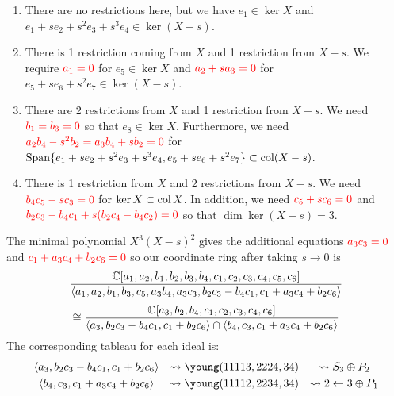 \documentclass{article}
\begin{document}
\begin{enumerate}[label=\boxed{\arabic*}:]
    \item There are no restrictions here, but we have $e_1 \in \ker X$ and $e_1 + se_2 +s^2e_3 + s^3e_4 \in \ker (X-s)$.
    \item There is 1 restriction coming from $X$ and 1 restriction from $X-s$. We require ${\color{red} a_1 = 0}$ for $e_5 \in \ker X$ and ${\color{red} a_2 + sa_3 = 0}$ for $e_5 + se_6 + s^2e_7 \in \ker (X-s)$.
    \item There are 2 restrictions from $X$ and 1 restriction from $X-s$. We need ${\color{red} b_1 = b_3 = 0}$ so that $e_8 \in \ker X$. Furthermore, we need ${\color{red} a_2b_4 - s^2b_2 = a_3b_4 + sb_2 = 0}$ for $\operatorname{Span}\{e_1 + se_2 +s^2e_3 + s^3e_4, e_5 + se_6 + s^2e_7\} \subset \operatorname{col} (X-s)$.
    \item There is 1 restriction from $X$ and 2 restrictions from $X-s$. We need ${\color{red} b_4c_5 - sc_3 = 0}$ for $\ker X \subset \operatorname{col} X$. In addition, we need ${\color{red} c_5 + sc_6 = 0}$ and ${\color{red} b_2c_3 - b_4c_1 + s(b_2c_4 - b_4c_2) = 0}$ so that $\dim \ker (X-s) = 3$.
\end{enumerate}
The minimal polynomial $X^3(X-s)^2$ gives the additional equations ${\color{red} a_3c_3 = 0}$ and ${\color{red} c_1 + a_3c_4 + b_2c_6 = 0}$ so our coordinate ring after taking $s \rightarrow 0$ is
$$\frac{\mathbb C[a_1,a_2,b_1,b_2,b_3,b_4,c_1,c_2,c_3,c_4,c_5,c_6]}{\langle a_1,a_2,b_1,b_3,c_5,a_3b_4,a_3c_3,b_2c_3-b_4c_1,c_1+a_3c_4+b_2c_6 \rangle}$$
$$ \cong \frac{\mathbb C[a_3,b_2,b_4,c_1,c_2,c_3,c_4,c_6]}{\langle a_3,b_2c_3-b_4c_1,c_1+b_2c_6 \rangle \cap \langle b_4,c_3,c_1+a_3c_4+b_2c_6 \rangle}$$
The corresponding tableau for each ideal is:
\[\begin{array}{ccc}\vspace{1mm}
    \langle a_3,b_2c_3-b_4c_1,c_1+b_2c_6 \rangle &\leadsto \young(11113,2224,34) &\leadsto S_3 \oplus P_2 \\ 
    \langle b_4,c_3,c_1+a_3c_4+b_2c_6 \rangle &\leadsto \young(11112,2234,34) &\leadsto 2 \leftarrow 3 \oplus P_1
\end{array}
\]
\end{document}
